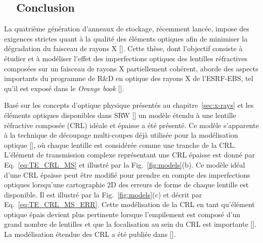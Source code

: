 \begin{refsection}\renewcommand{\thechapter}{7.fr}
\chapter{~~Conclusion}\label{sec:conclusion_fr}

La quatrième génération d'anneaux de stockage, récemment lancée, impose des exigences strictes quant à la qualité des éléments optiques afin de minimiser la dégradation du faisceau de rayons X  [\cite{Schroer2014,Yabashi2014}]. Cette thèse, dont l'objectif consiste à étudier et à modéliser l'effet des imperfections optiques des lentilles réfractives composées sur un faisceau de rayons X partiellement cohérent, aborde des aspects importants du programme de R\&D en optique des rayons X de l'ESRF-EBS, tel qu'il est exposé dans le \textit{Orange book} [\cite{orangebook}]. 

Basé sur les concepts d'optique physique présentés au chapitre~\ref{sec:x-rays} et les éléments optiques disponibles dans SRW [\cite{Baltser2011}] un modèle étendu à une lentille réfractive composée (CRL) idéale et épaisse a été présenté. Ce modèle s’apparente à la technique de découpage multi-coupes déjà utilisée pour la modélisation optique [\cite{Li2017,Ali2020}], où chaque lentille est considérée comme une tranche de la CRL. L'élément de transmission complexe représentant une CRL épaisse est donné par Eq.~\ref{eq:TE_CRL_MS} et illustré par la Fig.~\ref{fig:models}(b). Ce modèle idéal d'une CRL épaisse peut être modifié pour prendre en compte des imperfections optiques lorsqu'une cartographie 2D des erreurs de forme de chaque lentille est disponible. Il est illustré par la Fig.~\ref{fig:models}(c) et décrit par Eq.~\ref{eq:TE_CRL_MS_ERR}. Cette modélisation de la CRL en tant qu'élément optique épais devient plus pertinente lorsque l’empilement est composé d'un grand nombre de lentilles et que la focalisation au sein du CRL est importante [\cite{Schroer2005}]. La modélisation étendue des CRL a été publiée dans [\cite{Celestre2020}].


\end{refsection}
